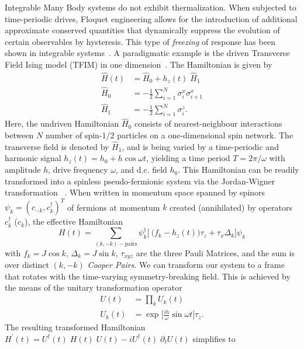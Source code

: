 \documentclass[%
reprint,
superscriptaddress,
amsmath,amssymb,
aps,
prb,
showkeys,
]{revtex4-2}
\begin{document}
Integrable Many Body systems do not exhibit thermalization. When subjected to time-periodic drives, Floquet engineering allows for the introduction of additional approximate conserved quantities that dynamically suppress the evolution of certain observables by hysteresis. This type of \textit{freezing} of response
has been shown in integrable systems~\cite{roy_fate_2015}.
A paradigmatic example is  the driven Transverse Field Ising model (TFIM) in one dimension~\cite{stinchcombe_ising_1973}. The Hamiltonian is given by
	\begin{align}
		\label{eq:tfim:hamilt}
		\hat{H}(t) &= \hat{H}_0 + h_z(t) \; \hat{H}_1\\
		\hat{H}_0 &= -\frac{1}{2}\sum^N_{i=1} \sigma^x_i \sigma^x_{i+1}\\
		\hat{H}_1 &= -\frac{1}{2}\sum_{i=1}^N \sigma^z_{i}.
	\end{align}
Here, the undriven Hamiltonian $\hat{H}_0$ consists of nearest-neighbour interactions between $N$ number of  spin-$1/2$ particles on a one-dimensional spin network. The transverse field is denoted by $\hat{H}_1$, and is being varied by a time-periodic and harmonic signal $h_z(t) = h_0 + h\cos{\omega t}$, yielding a time period $T=2\pi/\omega$ with amplitude $h$, drive frequency $\omega$, and d.c. field $h_0$. This Hamiltonian can be readily transformed into a spinless pseudo-fermionic system via the Jordan-Wigner transformation ~\cite{mbeng_quantum_2020}. When written in momentum space spanned by spinors $\psi_k = (c_{-k}, c^\dagger_k)^T$ of fermions at momentum $k$ created (annihilated) by operators $c^\dagger_k$ ($c_k$), the effective Hamiltonian
	\begin{equation}
		H(t) = \sum_{(k,-k)-\mbox{pairs}} \psi^\dagger_k
		\Bigg[\ \bigg(f_k - h_z(t)\bigg)\tau_z +  \tau_x \Delta_k\Bigg]\psi_k
	\end{equation}
	with $f_k = J\cos{k}$, $\Delta_k = J\sin{k}$, $\tau_{xyz}$ are the three Pauli Matrices, and the sum is over distinct $(k, -k)$ \textit{Cooper Pairs}. We can transform our system to a frame that rotates with the time-varying symmetry-breaking field. This is achieved by the means of the unitary transformation operator 
	\begin{align}
		\label{eq:rotation:tfim}
	U(t) &= \prod_k U_k(t)\\
	U_k(t) &= \exp{\Big[\frac{i h}{\omega}\sin{\omega t}\Big]\tau_z}.\nonumber
	\end{align} 
	The resulting transformed Hamiltonian $H^\prime(t) = U^\dagger(t)\;H(t)\;U(t)-iU^\dagger(t)\;\partial_tU(t)$ simplifies to
\end{document}
